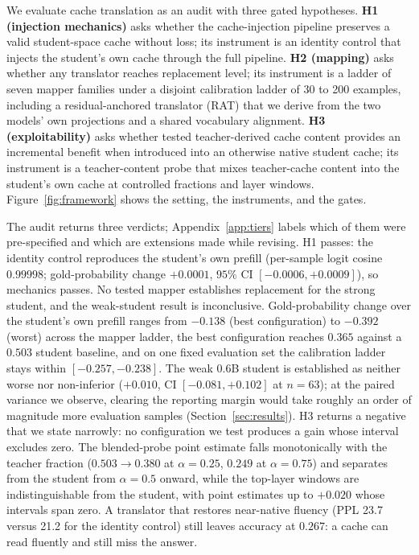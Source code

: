 \documentclass{article} %
\begin{document}
We evaluate cache translation as an audit with three gated hypotheses.
\textbf{H1 (injection mechanics)} asks whether the cache-injection pipeline preserves a valid
student-space cache without loss;
its instrument is an identity control that injects the student's own cache
through the full pipeline. \textbf{H2 (mapping)} asks whether any translator
reaches replacement level; its instrument is a ladder of seven mapper families
under a disjoint calibration ladder of 30 to 200 examples, including a
residual-anchored translator (RAT) that we derive from the two models' own
projections and a shared vocabulary alignment. \textbf{H3 (exploitability)}
asks whether tested teacher-derived cache content provides an incremental
benefit when introduced into an otherwise native student cache; its instrument
is a teacher-content probe that mixes teacher-cache content into
the student's own cache at controlled fractions and layer windows. Figure~\ref{fig:framework}
shows the setting, the instruments, and the gates.

The audit returns three verdicts; Appendix~\ref{app:tiers} labels which of them
were pre-specified and which are extensions made while revising. H1 passes: the
identity control reproduces the student's own prefill (per-sample logit cosine
$0.99998$; gold-probability change $+0.0001$, $95\%$ CI $[-0.0006, +0.0009]$),
so mechanics passes. No tested mapper establishes replacement for the strong
student, and the weak-student result is inconclusive. Gold-probability change
over the student's own prefill ranges from $-0.138$
(best configuration) to $-0.392$ (worst) across the mapper ladder, the best
configuration reaches $0.365$ against a $0.503$ student baseline, and on one
fixed evaluation set the calibration ladder stays within $[-0.257, -0.238]$.
The weak 0.6B student is established as neither worse nor non-inferior
($+0.010$, CI $[-0.081, +0.102]$ at $n{=}63$); at the paired variance we
observe, clearing the reporting margin would take roughly an order of
magnitude more evaluation samples (Section~\ref{sec:results}). H3 returns a
negative that we state narrowly: no configuration we test produces a gain whose
interval excludes zero. The blended-probe point estimate falls monotonically
with the teacher fraction ($0.503 \to 0.380$ at $\alpha{=}0.25$, $0.249$ at
$\alpha{=}0.75$) and separates from the student from $\alpha{=}0.5$ onward,
while the top-layer windows are indistinguishable from the student, with point
estimates up to $+0.020$ whose intervals span zero. A translator that restores
near-native fluency (PPL 23.7 versus 21.2 for the identity control) still leaves
accuracy at $0.267$: a cache can read fluently and still miss the answer.
\end{document}
